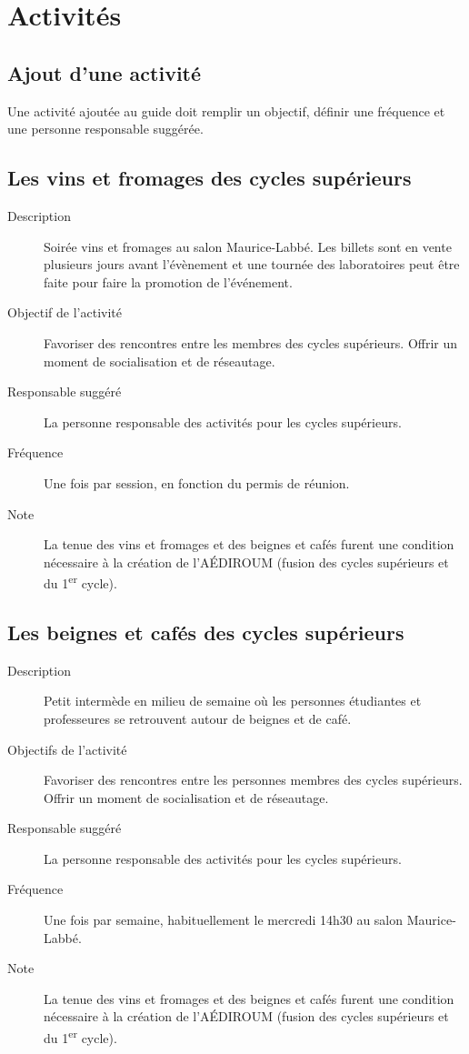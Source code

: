 \documentclass{aediroum}
\begin{document}
\section{Activités}\label{sec:activites}

\subsection{Ajout d'une activité}\label{sec:ajout-activite}

Une activité ajoutée au guide doit remplir un objectif, définir une fréquence et une personne responsable suggérée.

\subsection{Les vins et fromages des cycles supérieurs}\label{sec:vins-et-fromages}

\begin{description}
    \item[Description] Soirée vins et fromages au salon Maurice-Labbé. Les billets sont en vente plusieurs jours avant l'évènement et une tournée des laboratoires peut être faite pour faire la promotion de l'événement.
    \item[Objectif de l'activité] Favoriser des rencontres entre les membres des cycles supérieurs. Offrir un moment de socialisation et de réseautage.
    \item[Responsable suggéré] La personne responsable des activités pour les cycles supérieurs.
    \item[Fréquence] Une fois par session, en fonction du permis de réunion.
    \item[Note] La tenue des vins et fromages et des beignes et cafés furent une condition nécessaire à la création de l'AÉDIROUM (fusion des cycles supérieurs et du 1\textsuperscript{er} cycle).
\end{description}

\subsection{Les beignes et cafés des cycles supérieurs}\label{sec:beignes-et-cafes}

\begin{description}
    \item[Description] Petit intermède en milieu de semaine où les personnes étudiantes et professeures se retrouvent autour de beignes et de café.
    \item[Objectifs de l'activité] Favoriser des rencontres entre les personnes membres des cycles supérieurs. Offrir un moment de socialisation et de réseautage.
    \item[Responsable suggéré] La personne responsable des activités pour les cycles supérieurs.
    \item[Fréquence] Une fois par semaine, habituellement le mercredi 14h30 au salon Maurice-Labbé.
    \item[Note] La tenue des vins et fromages et des beignes et cafés furent une condition nécessaire à la création de l'AÉDIROUM (fusion des cycles supérieurs et du 1\textsuperscript{er} cycle).
\end{description}
\end{document}
